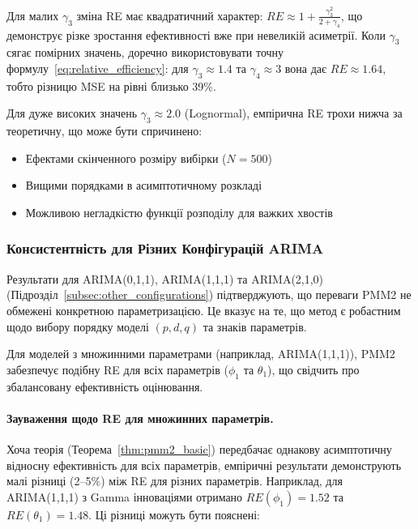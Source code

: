 \documentclass[12pt,a4paper]{article}
\begin{document}
Для малих $\gamma_3$ зміна RE має квадратичний характер: $RE \approx 1 + \frac{\gamma_3^2}{2 + \gamma_4}$, що демонструє різке зростання ефективності вже при невеликій асиметрії. Коли $\gamma_3$ сягає помірних значень, доречно використовувати точну формулу~\eqref{eq:relative_efficiency}: для $\gamma_3 \approx 1.4$ та $\gamma_4 \approx 3$ вона дає $RE \approx 1.64$, тобто різницю MSE на рівні близько 39\%.

Для дуже високих значень $\gamma_3 \approx 2.0$ (Lognormal), емпірична RE трохи нижча за теоретичну, що може бути спричинено:
\begin{itemize}
    \item Ефектами скінченного розміру вибірки ($N = 500$)
    \item Вищими порядками в асимптотичному розкладі
    \item Можливою негладкістю функції розподілу для важких хвостів
\end{itemize}

\subsubsection{Консистентність для Різних Конфігурацій ARIMA}

Результати для ARIMA(0,1,1), ARIMA(1,1,1) та ARIMA(2,1,0) (Підрозділ~\ref{subsec:other_configurations}) підтверджують, що переваги PMM2 не обмежені конкретною параметризацією. Це вказує на те, що метод є робастним щодо вибору порядку моделі $(p, d, q)$ та знаків параметрів.

Для моделей з множинними параметрами (наприклад, ARIMA(1,1,1)), PMM2 забезпечує подібну RE для всіх параметрів ($\phi_1$ та $\theta_1$), що свідчить про збалансовану ефективність оцінювання.

\paragraph{Зауваження щодо RE для множинних параметрів.}

Хоча теорія (Теорема~\ref{thm:pmm2_basic}) передбачає однакову асимптотичну відносну ефективність для всіх параметрів, емпіричні результати демонструють малі різниці (2--5\%) між RE для різних параметрів. Наприклад, для ARIMA(1,1,1) з Gamma інноваціями отримано $RE(\phi_1) = 1.52$ та $RE(\theta_1) = 1.48$. Ці різниці можуть бути пояснені:
\end{document}
